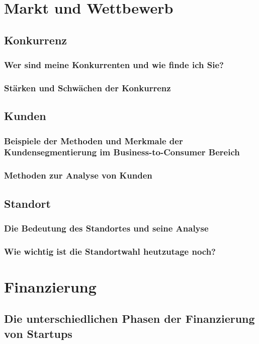\chapter{Markt und Wettbewerb}
\section{Konkurrenz}
\subsection{Wer sind meine Konkurrenten und wie finde ich Sie?}

\subsection{Stärken und Schwächen der Konkurrenz}

\section{Kunden}
\subsection{Beispiele der Methoden und Merkmale der Kundensegmentierung im Business-to-Consumer Bereich}

\subsection{Methoden zur Analyse von Kunden}

\section{Standort}
\subsection{Die Bedeutung des Standortes und seine Analyse}

\subsection{Wie wichtig ist die Standortwahl heutzutage noch?}

\chapter{Finanzierung}
\section{Die unterschiedlichen Phasen der Finanzierung von Startups}

